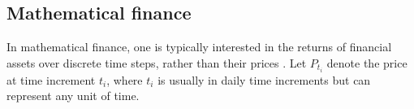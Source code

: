 


\subsection{Mathematical finance}\label{sec:MathematicalFinance}
In mathematical finance, one is typically interested in the returns of financial assets over discrete time steps, rather than their prices . Let $P_{t_i}$ denote the price at time increment $t_i$, where $t_i$ is usually in daily time increments but can represent any unit of time. 

